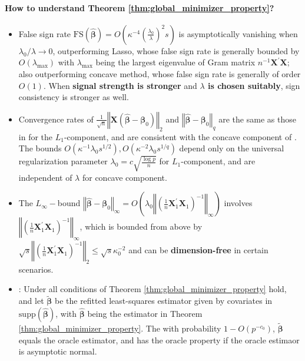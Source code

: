 \documentclass[twoside]{article}
\begin{document}
\paragraph*{How to understand Theorem \ref{thm:global_minimizer_property}?} 
\begin{itemize}
    \item False sign rate $\mathrm{FS}\left(\hat{\boldsymbol{\beta}}\right) = O\left( \kappa^{-4} \left(\frac{\lambda_0}{\lambda}\right)^2 s \right)$  is asymptotically vanishing when $\lambda_0/\lambda\rightarrow 0$, outperforming Lasso, whose false sign rate is generally bounded by $O\left( \lambda_{\max} \right)$ with $\lambda_{\max}$ being the largest eigenvalue of Gram matrix $n^{-1}\mathbf{X}^{\prime}\mathbf{X}$; also outperforming concave method, whose false sign rate is generally of order $O(1)$. When \textbf{signal strength is stronger} and \textbf{$\lambda$ is chosen suitably}, sign consistency is stronger as well.
    \item Convergence rates of $\frac{1}{\sqrt{n}}\left\Vert \mathbf{X}\left( \hat{\boldsymbol{\beta}} -\boldsymbol{\beta}_0 \right) \right\Vert _2$ and $\left\Vert \hat{\boldsymbol{\beta}}-\boldsymbol{\beta}_0 \right\Vert _q$ are the same as those in \citet{bickel2009simultaneous} for the $L_1$-component, and are consistent with the concave component of \citet{zhang2012general}. The bounds $O(\kappa^{-1}\lambda_0 s^{1/2}),O(\kappa^{-2}\lambda_0 s^{1/q})$ depend only on the universal regularization parameter $\lambda_0 = c\sqrt{\frac{\log p}{n}}$ for $L_1$-component, and are independent of $\lambda$ for concave component.
    \item The $L_{\infty}-$bound $\left\Vert \hat{\boldsymbol{\beta}}-\boldsymbol{\beta}_0 \right\Vert _{\infty} = O\left(\lambda_0\left\Vert \left(\frac{1}{n}\mathbf{X}^{\prime}_1\mathbf{X}_1 \right)^{-1} \right\Vert _{\infty}\right)$ involves $\left\Vert \left(\frac{1}{n}\mathbf{X}^{\prime}_1\mathbf{X}_1 \right)^{-1} \right\Vert _{\infty}$, which is bounded from above by $\sqrt{s}\left\Vert \left(\frac{1}{n}\mathbf{X}^{\prime}_1\mathbf{X}_1 \right)^{-1} \right\Vert _2 \leq \sqrt{s}\kappa_0^{-2}$ and can be \textbf{dimension-free} in certain scenarios.
    \item {}: Under all conditions of Theorem \ref{thm:global_minimizer_property} hold, and let $\tilde{\boldsymbol{\beta}}$ be the refitted least-squares estimator given by covariates in $\mathrm{supp}\left( \hat{\boldsymbol{\beta}} \right)$, with $\hat{\boldsymbol{\beta}}$ being the estimator in Theorem \ref{thm:global_minimizer_property}. The with probability $1-O(p^{-c_0})$, $\tilde{\boldsymbol{\beta}}$ equals the oracle estimator, and has the oracle property if the oracle estimaor is asymptotic normal.
\end{itemize}
\end{document}
